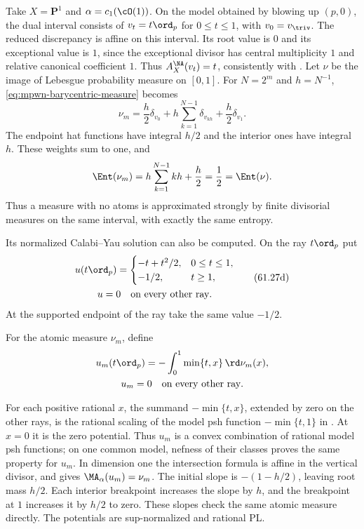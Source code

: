 \begin{example}\label{ex:mpwn-interval-barycentric-measures}
Take $X=\mathbf P^1$ and $\alpha=c_1(\cO(1))$. On the model obtained by blowing up $(p,0)$, the dual interval consists of $v_t=t\ord_p$ for $0\leq t\leq1$, with $v_0=v_{\triv}$. The reduced discrepancy is affine on this interval. Its root value is $0$ and its exceptional value is $1$, since the exceptional divisor has central multiplicity $1$ and relative canonical coefficient $1$. Thus $A_X^{\NA}(v_t)=t$, consistently with . Let $\nu$ be the image of Lebesgue probability measure on $[0,1]$. For $N=2^m$ and $h=N^{-1}$, \eqref{eq:mpwn-barycentric-measure} becomes
\[
 \nu_m=\frac h2\delta_{v_0}
              +h\sum_{k=1}^{N-1}\delta_{v_{kh}}
              +\frac h2\delta_{v_1}.
\]
The endpoint hat functions have integral $h/2$ and the interior ones have integral $h$. These weights sum to one, and
\[
 \Ent(\nu_m)=h\sum_{k=1}^{N-1}kh+\frac h2
            =\frac12=\Ent(\nu).
\]
Thus a measure with no atoms is approximated strongly by finite divisorial measures on the same interval, with exactly the same entropy.

Its normalized Calabi--Yau solution can also be computed. On the ray
$t\ord_p$ put
\[
 \begin{gathered}
 u(t\ord_p)=
 \begin{cases}
 -t+t^2/2,&0\leq t\leq1,\\
 -1/2,&t\geq1,
 \end{cases}
 \\
 u=0\quad\text{on every other ray}.
 \end{gathered}
\tag{61.27d}\label{eq:mpwn-interval-continuous-solution}
\]
At the supported endpoint of the ray take the same value $-1/2$.
\par\noindent\begin{minipage}{\linewidth}
For the atomic measure $\nu_m$, define
\[
 \begin{gathered}
 u_m(t\ord_p)=-\int_0^1\min\{t,x\}\,\rd\nu_m(x),\\
 u_m=0\quad\text{on every other ray}.
 \end{gathered}
\]
\end{minipage}\par
For each positive rational $x$, the summand $-\min\{t,x\}$,
extended by zero on the other rays, is the rational scaling of
the model psh function $-\min\{t,1\}$ in
. At $x=0$ it is the zero potential.
Thus $u_m$ is a convex combination of rational model psh functions;
on one common model, nefness of their classes proves the same
property for $u_m$. In dimension one the intersection formula is
affine in the vertical divisor, and gives $\MA_\alpha(u_m)=\nu_m$.
The initial slope is $-(1-h/2)$, leaving root mass $h/2$.
Each interior breakpoint increases the slope by $h$, and the
breakpoint at $1$ increases it by $h/2$ to zero. These slopes
check the same atomic measure directly. The potentials are
sup-normalized and rational PL.


\end{example}
